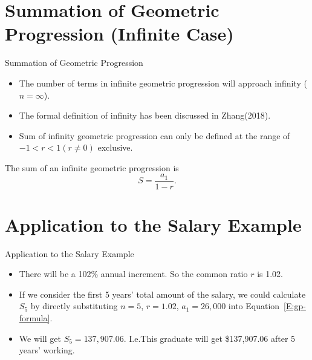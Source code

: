 \section{Summation of Geometric Progression (Infinite Case)}
\begin{frame}[<+->]{Summation of Geometric Progression}
    \begin{itemize}
        \item The number of terms in infinite geometric progression will approach infinity ($n=\infty$).
        \item The formal definition of infinity has been discussed in Zhang(2018).
        \item Sum of infinity geometric progression can only be defined at the range of $-1<r<1 (r\neq 0)$ exclusive.
    \end{itemize}
    \begin{thm}
        The sum of an infinite geometric progression is
        \[
            S = \frac{a_1}{1-r}.
        \]
    \end{thm}
\end{frame}



\section{Application to the Salary Example}
\begin{frame}[<+->]{Application to the Salary Example}
    \begin{exmp}
        \begin{itemize}
            \item There will be a 102\% annual increment. So the common ratio $r$ is 1.02.
            \item If we consider the first 5 years' total amount of the salary, we could calculate $S_5$ by directly substituting $n=5$, $r=1.02$, $a_1=26,000$ into Equation~\eqref{E:gp-formula}.
            \item We will get $S_5=137,907.06$. I.e.This graduate will get \$137,907.06 after 5 years' working.
        \end{itemize}
    \end{exmp}
\end{frame}



